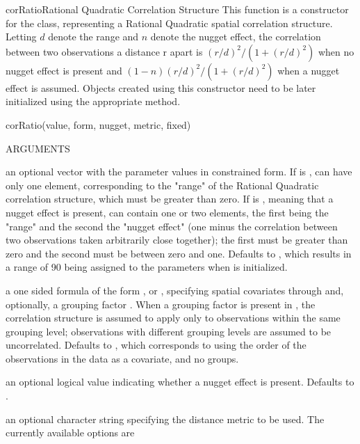 \documentclass[pdftex]{article} \usepackage{url,graphicx}
\renewcommand{\Twiddle}{\mbox{\(\sim\)}}
\begin{document}
\begin{Helpfile}{corRatio}{Rational Quadratic Correlation Structure}
  This function is a constructor for the  class,
  representing a Rational Quadratic spatial correlation structure.
  Letting $d$ denote the range and $n$ denote the nugget effect, the
  correlation between two observations a distance r apart is
  $(r/d)^2/\left(1+(r/d)^2\right)$ when no nugget effect is present
  and $(1-n)(r/d)^2/\left(1+(r/d)^2\right)$ when a nugget effect is
  assumed. Objects created using this constructor need to be later
  initialized using the appropriate  method.
\begin{Example}
corRatio(value, form, nugget, metric, fixed)
\end{Example}
\begin{Argument}{ARGUMENTS}
\item[\Co{value:}]
an optional vector with the parameter values in
constrained form. If  is ,  can
have only one element, corresponding to the "range" of the
Rational Quadratic correlation structure, which must be greater than
zero. If  is , meaning that a nugget effect
is present,  can contain one or two elements, the first
being the "range" and the second the "nugget effect" (one minus the
correlation between two observations taken arbitrarily close
together); the first must be greater than zero and the second must be
between zero and one. Defaults to , which results in
a range of 90%
being assigned to the parameters when  is initialized.
\item[\Co{form:}]
a one sided formula of the form \Co{{\Twiddle} S1+...+Sp}, or
\Co{{\Twiddle} S1+...+Sp | g}, specifying spatial covariates 
through  and,  optionally, a grouping factor . 
When a grouping factor is present in , the correlation
structure is assumed to apply only to observations within the same
grouping level; observations with different grouping levels are
assumed to be uncorrelated. Defaults to \Co{{\Twiddle} 1}, which corresponds
to using the order of the observations in the data as a covariate,
and no groups.
\item[\Co{nugget:}]
an optional logical value indicating whether a nugget
effect is present. Defaults to .
\item[\Co{metric:}]
an optional character string specifying the distance
metric to be used. The currently available options are

\end{Argument}
\end{Helpfile}
\end{document}
